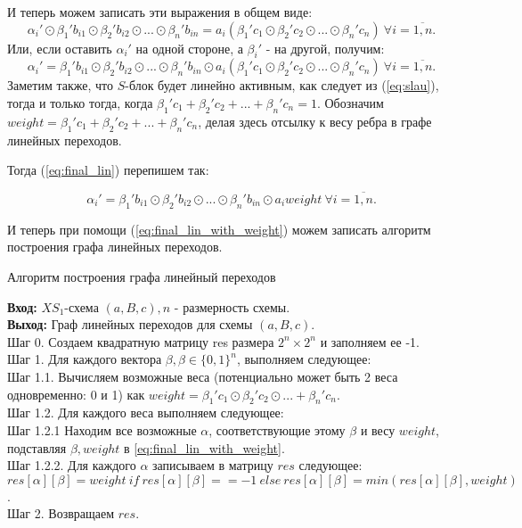 \documentclass[a4paper,12pt]{report}
\theoremstyle{plain} %
\theoremstyle{definition}
\theoremstyle{remark}
\begin{document}
\begin{large}
И теперь можем записать эти выражения в общем виде:
\begin{equation}\label{eq:slau}\alpha_i' \odot \beta_1'b_{i1} \odot \beta_2'b_{i2} \odot ... \odot \beta_n'b_{in} = a_i(\beta_1'c_1 \odot \beta_2'c_2 \odot ... \odot \beta_n'c_n) ~ \forall i=\overline{1,n}. \end{equation}
Или, если оставить $\alpha_i'$ на одной стороне, а $\beta_i'$ - на другой, получим:
\begin{equation}\label{eq:final_lin}\alpha_i' = \beta_1'b_{i1} \odot \beta_2'b_{i2} \odot ... \odot \beta_n'b_{in} \odot a_i(\beta_1'c_1 \odot \beta_2'c_2 \odot ... \odot \beta_n'c_n) ~ \forall i=\overline{1,n}. \end{equation}
Заметим также, что $S$-блок будет линейно активным, как следует из (\ref{eq:slau}), тогда и только тогда, когда  $\beta_1'c_1 + \beta_2'c_2 + ... + \beta_n'c_n=1$. Обозначим $weight = \beta_1'c_1 + \beta_2'c_2 + ... + \beta_n'c_n$, делая здесь отсылку к весу ребра в графе линейных переходов.

Тогда  (\ref{eq:final_lin}) перепишем так:

\begin{equation}\label{eq:final_lin_with_weight}\alpha_i' = \beta_1'b_{i1} \odot \beta_2'b_{i2} \odot ... \odot \beta_n'b_{in} \odot a_iweight ~ \forall i=\overline{1,n}. \end{equation}

И теперь при помощи (\ref{eq:final_lin_with_weight}) можем записать алгоритм построения графа линейных переходов.

\begin{algorithm}[H]
\caption{Алгоритм построения графа линейный переходов}
\label{diff_graph_construct}
\textbf{Вход:} $XS_1$-схема $(a, B, c), n$ - размерность схемы.\\
\textbf{Выход:} Граф линейных переходов для схемы $(a, B, c)$.\\
Шаг 0. Создаем квадратную матрицу res размера $2^n \times 2^n$ и заполняем ее -1. \\
Шаг 1. Для каждого вектора $\beta, \beta \in \{0, 1\}^n$, выполняем следующее: \\
Шаг 1.1. Вычисляем возможные веса (потенциально может быть 2 веса одновременно: 0 и 1) как $weight=\beta_1'c_1 \odot \beta_2'c_2 \odot ... + \beta_n'c_n.$\\
Шаг 1.2. Для каждого веса выполняем следующее:\\
Шаг 1.2.1 Находим все возможные $\alpha$, соответствующие этому $\beta$ и весу $weight$, подставляя $\beta, weight$ в \ref{eq:final_lin_with_weight}.\\
Шаг 1.2.2. Для каждого $\alpha$ записываем в матрицу $res$ следующее: $res[\alpha][\beta] = weight ~if~ res[\alpha][\beta] == -1 ~else~res[\alpha][\beta]=min(res[\alpha][\beta], weight)  $.\\
Шаг 2. Возвращаем $res$.\\
\end{algorithm} 


\end{large}
\end{document}
